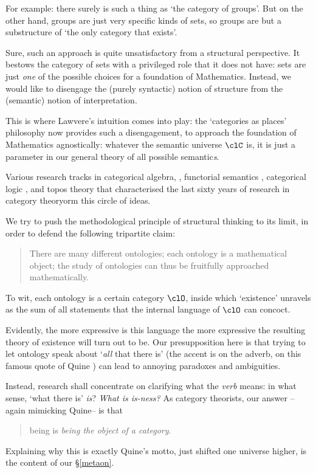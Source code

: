 For example: there surely is such a thing as `the category of groups'. But on the other hand, groups are just very specific kinds of sets, so groups are but a substructure of `the only category that exists'.

Sure, such an approach is quite unsatisfactory from a structural perspective. It bestows the category of sets with a privileged role that it does not have: sets are just \emph{one} of the possible choices for a foundation of Mathematics. Instead, we would like to disengage the (purely syntactic) notion of structure from the (semantic) notion of interpretation.

This is where Lawvere's intuition comes into play: the `categories as places' philosophy now provides such a disengagement, to approach the foundation of Mathematics agnostically: whatever the semantic universe $\clC$ is, it is just a parameter in our general theory of all possible semantic\emph{s}.

Various research tracks in categorical algebra, \cite{Janelidze2004}, functorial semantics \cite{lawvere1963functorial,hyland2007category}, categorical logic \cite{lambek1988introduction}, and topos theory \cite{JohnstonePT} that characterised the last sixty years of research in category theoryorm this circle of ideas.

We try to push the methodological principle of structural thinking to its limit, in order to defend the following tripartite claim: 
\begin{quote}
  There are many different ontologies; each ontology is a mathematical object; the study of ontologies can thus be fruitfully approached mathematically.
\end{quote}
To wit, each ontology is a certain category $\clO$, inside which `existence' unravels as the sum of all statements that the internal language of $\clO$ can concoct.

Evidently, the more expressive is this language the more expressive the resulting theory of existence will turn out to be. Our presupposition here is that trying to let ontology speak about `\emph{all} that there is' (the accent is on the adverb, on this famous quote of Quine \cite{quine1948there}) can lead to annoying paradoxes and ambiguities. 

Instead, research shall concentrate on clarifying what the \emph{verb} means: in what sense, `what there is' \emph{is}? \emph{What is is-ness?} As category theorists, our answer --again mimicking Quine-- is that
\begin{quote}
	being is \emph{being the object of a category}.
\end{quote}
Explaining why this is exactly Quine's motto, just shifted one universe higher, is the content of our §\ref{metaon}.
